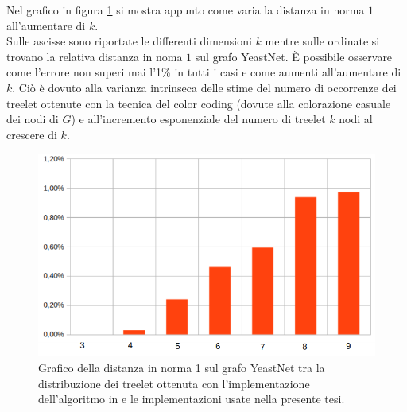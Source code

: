 Nel grafico in figura \ref{ERROR} si mostra appunto come varia la distanza in norma $1$ all'aumentare di $ k $.\\
Sulle ascisse sono riportate le differenti dimensioni $ k $ mentre sulle ordinate si trovano la relativa distanza in noma $1$ sul grafo YeastNet.
È possibile osservare come l'errore non superi mai l'1\% in tutti i casi e come aumenti all'aumentare di $k$. 
Ciò è dovuto alla varianza intrinseca delle stime del numero di occorrenze dei treelet ottenute con la tecnica del color coding (dovute alla colorazione casuale dei nodi di $G$) e all'incremento esponenziale del numero di treelet $k$ nodi al crescere di $k$.
 

\begin{figure}[htbp]
	\includegraphics[width=15.4cm]{capitolo4/grafoErrorel1}
	\caption{Grafico della distanza in norma 1 sul grafo YeastNet tra la distribuzione dei treelet ottenuta con l'implementazione dell'algoritmo in \cite{bressan2019motivo} e le implementazioni usate nella presente tesi.}
	\label{ERROR}
\end{figure}


